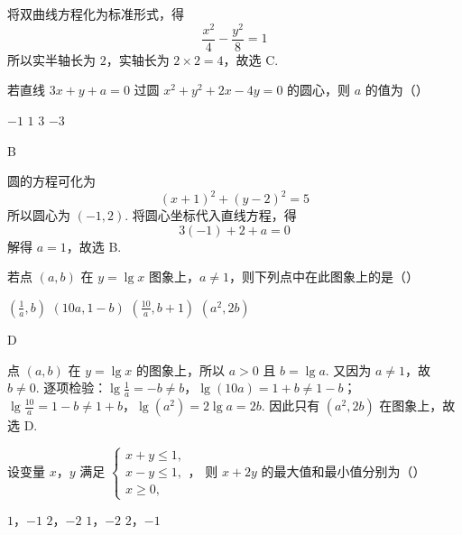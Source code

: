 \begin{solution}
将双曲线方程化为标准形式，得
\[
\frac{x^{2}}{4}-\frac{y^{2}}{8}=1
\]
所以实半轴长为 \(2\)，实轴长为 \(2\times2=4\)，故选 C.
\end{solution}

\begin{problem}
若直线 \(3x + y + a = 0\) 过圆 \(x^{2} + y^{2} + 2x - 4y = 0\) 的圆心，则 \(a\) 的值为（\quad）

\choices
    {\(-1\)}
    {\(1\)}
    {\(3\)}
    {\(-3\)}
\end{problem}

\begin{answer}
B
\end{answer}

\begin{solution}
圆的方程可化为
\[
(x+1)^{2}+(y-2)^{2}=5
\]
所以圆心为 \((-1,2)\). 将圆心坐标代入直线方程，得
\[
3(-1)+2+a=0
\]
解得 \(a=1\)，故选 B.
\end{solution}

\begin{problem}
若点 \((a, b)\) 在 \(y = \lg x\) 图象上，\(a \neq 1\)，则下列点中在此图象上的是（\quad）

\choices
    {\(\left(\frac{1}{a}, b\right)\)}
    {\((10a, 1 - b)\)}
    {\(\left(\frac{10}{a}, b + 1\right)\)}
    {\((a^{2}, 2b)\)}
\end{problem}

\begin{answer}
D
\end{answer}

\begin{solution}
点 \((a,b)\) 在 \(y=\lg x\) 的图象上，所以 \(a>0\) 且 \(b=\lg a\). 又因为 \(a\ne1\)，故 \(b\ne0\). 逐项检验：\(\lg\frac1a=-b\ne b\)，\(\lg(10a)=1+b\ne1-b\)；\(\lg\frac{10}{a}=1-b\ne1+b\)，\(\lg(a^{2})=2\lg a=2b\).
因此只有 \((a^{2},2b)\) 在图象上，故选 D.
\end{solution}

\begin{problem}
设变量 \(x\)，\(y\) 满足 \(\begin{cases}
x + y \leqslant 1,\\
x - y \leqslant 1,\\
x \geqslant 0,
\end{cases}\)，
则 \(x + 2y\) 的最大值和最小值分别为（\quad）

\choices
    {\(1\)，\(-1\)}
    {\(2\)，\(-2\)}
    {\(1\)，\(-2\)}
    {\(2\)，\(-1\)}
\end{problem}

